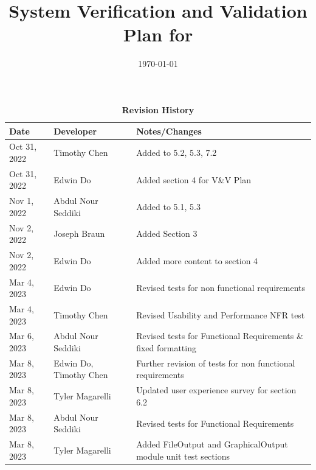 \documentclass[12pt, titlepage]{article}
\begin{document}
\title{System Verification and Validation Plan for \progname{}} 
\author{\authname}
\date{\today}
	
\maketitle


\begin{table}[H]
  \caption{\bf Revision History}
  \begin{tabularx}{\textwidth}{p{2.5cm}p{2.5cm}X}
  \toprule {\bf Date} & {\bf Developer} & {\bf Notes/Changes}\\
  \midrule
  Oct 31, 2022 & Timothy Chen & Added to 5.2, 5.3, 7.2\\
  Oct 31, 2022 & Edwin Do & Added section 4 for V\&V Plan\\
  Nov 1, 2022 & Abdul Nour Seddiki & Added to 5.1, 5.3\\
  Nov 2, 2022 & Joseph Braun & Added Section 3\\
  Nov 2, 2022 & Edwin Do & Added more content to section 4 \\
  Mar 4, 2023 & Edwin Do & Revised tests for non functional requirements\\
  Mar 4, 2023 & Timothy Chen & Revised Usability and Performance NFR test\\
  Mar 6, 2023 & Abdul Nour Seddiki & Revised tests for Functional Requirements \& fixed formatting\\
  Mar 8, 2023 & Edwin Do, Timothy Chen & Further revision of tests for non functional requirements\\
  Mar 8, 2023 & Tyler Magarelli & Updated user experience survey for section 6.2\\
  Mar 8, 2023 & Abdul Nour Seddiki & Revised tests for Functional Requirements\\
  Mar 8, 2023 & Tyler Magarelli & Added FileOutput and GraphicalOutput module unit test sections\\
  \bottomrule
  \end{tabularx}
  \end{table}
  

\newpage

\tableofcontents

\listoftables


\newpage
\end{document}
